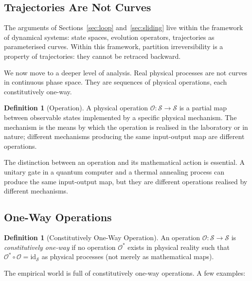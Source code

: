 \documentclass[twocolumn,10pt,a4paper]{article}
\theoremstyle{definition}
\newtheorem{definition}[theorem]{Definition}
\theoremstyle{remark}
\newcommand{\Operation}{\mathcal{O}}
\newcommand{\StateSpace}{\mathcal{S}}
\begin{document}
\subsection{Trajectories Are Not Curves}

The arguments of Sections~\ref{sec:loop} and~\ref{sec:sliding} live within the framework of dynamical systems: state spaces, evolution operators, trajectories as parameterised curves. Within this framework, partition irreversibility is a property of trajectories: they cannot be retraced backward.

We now move to a deeper level of analysis. Real physical processes are not curves in continuous phase space. They are sequences of physical operations, each constitutively one-way.

\begin{definition}[Operation]
A physical operation $\Operation: \StateSpace \to \StateSpace$ is a partial map between observable states implemented by a specific physical mechanism. The mechanism is the means by which the operation is realised in the laboratory or in nature; different mechanisms producing the same input-output map are different operations.
\end{definition}

The distinction between an operation and its mathematical action is essential. A unitary gate in a quantum computer and a thermal annealing process can produce the same input-output map, but they are different operations realised by different mechanisms.

\subsection{One-Way Operations}

\begin{definition}[Constitutively One-Way Operation]
An operation $\Operation: \StateSpace \to \StateSpace$ is \emph{constitutively one-way} if no operation $\Operation^*$ exists in physical reality such that $\Operation^* \circ \Operation = \mathrm{id}_{\StateSpace}$ as physical processes (not merely as mathematical maps).
\end{definition}

The empirical world is full of constitutively one-way operations. A few examples:
\end{document}
